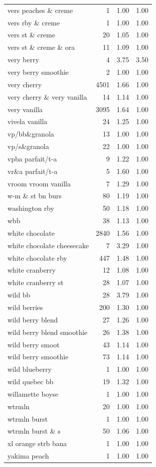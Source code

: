 \begin{table}
\begin{tabular}{lrrr}
vers peaches \& creme & 1 & 1.00 & 1.00 \\
vers rby \& creme & 1 & 1.00 & 1.00 \\
vers st \& creme & 20 & 1.05 & 1.00 \\
vers st \& creme \& ora & 11 & 1.09 & 1.00 \\
very berry & 4 & 3.75 & 3.50 \\
very berry smoothie & 2 & 1.00 & 1.00 \\
very cherry & 4501 & 1.66 & 1.00 \\
very cherry \& very vanilla & 14 & 1.14 & 1.00 \\
very vanilla & 3095 & 1.64 & 1.00 \\
vivela vanilla & 24 & 1.25 & 1.00 \\
vp/bb\&granola & 13 & 1.00 & 1.00 \\
vp/s\&granola & 22 & 1.00 & 1.00 \\
vpba parfait/t-a & 9 & 1.22 & 1.00 \\
vr\&a parfait/t-a & 5 & 1.60 & 1.00 \\
vroom vroom vanilla & 7 & 1.29 & 1.00 \\
w-m \& st bn burs & 80 & 1.19 & 1.00 \\
washington rby & 50 & 1.18 & 1.00 \\
wbb & 38 & 1.13 & 1.00 \\
white chocolate & 2840 & 1.56 & 1.00 \\
white chocolate cheesecake & 7 & 3.29 & 1.00 \\
white chocolate rby & 447 & 1.48 & 1.00 \\
white cranberry & 12 & 1.08 & 1.00 \\
white cranberry st & 28 & 1.07 & 1.00 \\
wild bb & 28 & 3.79 & 1.00 \\
wild berries & 200 & 1.30 & 1.00 \\
wild berry blend & 27 & 1.26 & 1.00 \\
wild berry blend smoothie & 26 & 1.38 & 1.00 \\
wild berry smoot & 43 & 1.14 & 1.00 \\
wild berry smoothie & 73 & 1.14 & 1.00 \\
wild blueberry & 1 & 1.00 & 1.00 \\
wild quebec bb & 19 & 1.32 & 1.00 \\
willamette boyse & 1 & 1.00 & 1.00 \\
wtrmln & 20 & 1.00 & 1.00 \\
wtrmln burst & 1 & 1.00 & 1.00 \\
wtrmln burst \& s & 50 & 1.06 & 1.00 \\
xl orange strb bana & 1 & 1.00 & 1.00 \\
yakima peach & 1 & 1.00 & 1.00 \\
\bottomrule
\end{tabular}
\end{table}
